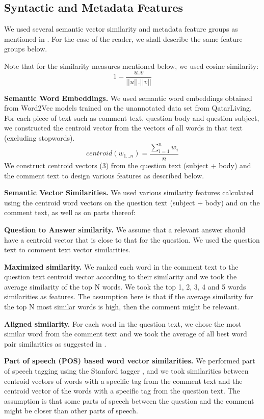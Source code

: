 \documentclass[12pt, a4paper, oneside]{Thesis} %
\begin{document}
\subsection{Syntactic and Metadata Features}

We used several semantic vector similarity and metadata feature groups as mentioned in \cite{mihaylov2016semanticz}. For the ease of the reader, we shall describe the same feature groups below. 

Note that for the similarity measures mentioned below, we used cosine similarity:
\[ 1 - \frac{u.v}{||u||.||v||} \tag{2} \label{equation:2} \]

\textbf{Semantic Word Embeddings.} We used semantic word embeddings obtained from Word2Vec models trained on the unannotated data set from QatarLiving. For each piece of text such as comment text, question body and question subject, we constructed the centroid vector from the vectors of all words in that text (excluding stopwords).
\[ centroid(w_{1...n}) = \frac{\sum\limits_{i=1}^{n} w_i}{n} \tag{3} \label{equation:3} \]
We construct centroid vectors (3) from the question text (subject + body) and the comment text to design various features as described below.

\textbf{Semantic Vector Similarities.} We used various similarity features calculated using the centroid word vectors on the question text (subject + body) and on the comment text, as well as on parts thereof:

\textbf{Question to Answer similarity.} We assume that a relevant answer should have a centroid vector that is close to that for the question. We used the question text to comment text vector similarities.

\textbf{Maximized similarity.} We ranked each word in the comment text to the question text centroid vector according to their similarity and we took the average similarity of the top N words. We took the top 1, 2, 3, 4 and 5 words similarities as features. The assumption here is that if the average similarity for the top N most similar words is high, then the comment might be relevant.

\textbf{Aligned similarity.} For each word in the question text, we chose the most similar word from the comment text and we took the average of all best word pair similarities as suggested in \cite{tran2015jaist}.

\textbf{Part of speech (POS) based word vector similarities.} We performed part of speech tagging using the Stanford tagger \cite{toutanova2003feature}, and we took similarities between centroid vectors of words with a specific tag from the comment text and the centroid vector of the words with a specific tag from the question text. The assumption is that some parts of speech between the question and the comment might be closer than other parts of speech.
\end{document}
